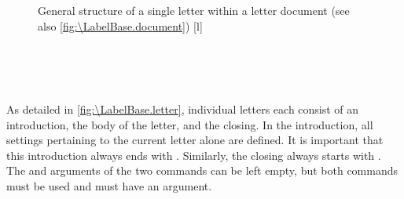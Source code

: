 \begin{figure}
  \setcapindent{0pt}%
  \begin{captionbeside}{%
      General structure of a single letter within a letter document (see also
      \autoref{fig:\LabelBase.document})%
      \label{fig:\LabelBase.letter}}[l]
    \begin{minipage}[b]{.667\linewidth}%
      \centering\small\setlength{\fboxsep}{1.5ex}%
      \addtolength{\linewidth}{-\dimexpr2\fboxrule+2\fboxsep\relax}%
      \\[1pt]
      \\[1pt]
      \\[\dimexpr\fboxsep+\fboxrule\relax]
    \end{minipage}
  \end{captionbeside}
\end{figure}

As detailed in \autoref{fig:\LabelBase.letter}, individual letters each
consist of an introduction, the body of the letter, and the closing. In the
introduction, all settings pertaining to the current letter alone are defined.
It is important that this introduction always ends with
. Similarly, the closing
always starts with . The
 and  arguments of the two commands can be left
empty, but both commands must be used and must have an argument.

